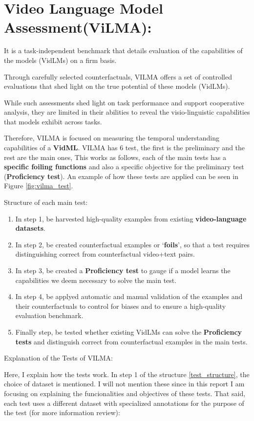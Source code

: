 \section{Video Language Model Assessment(ViLMA):}

It is a task-independent benchmark that details evaluation of the capabilities of the models (VidLMs) on a firm basis.

Through carefully selected counterfactuals, VILMA offers a set of controlled evaluations that shed light on the true potential of these models (VidLMs).

While such assessments shed light on task performance and support cooperative analysis, they are limited in their abilities to reveal the visio-linguistic capabilities that models exhibit across tasks.

Therefore, VILMA is focused on measuring the temporal understanding capabilities of a \textbf{VidML}. VILMA has 6 test, the first is the preliminary and the rest are the main ones, This works as follows, each of the main tests has a \textbf{specific foiling functions} and also a specific objective for the preliminary test (\textbf{Proficiency test}). An example of how these tests are applied can be seen in Figure \ref{fig:vilma_test}.

Structure of each main test:

\begin{enumerate} \label{test_structure}
\item In step 1, be harvested high-quality examples from existing \textbf{video-language datasets}.
\item In step 2, be created counterfactual examples or ‘\textbf{foils}’, so that a test requires distinguishing correct from counterfactual video+text pairs.
\item In step 3, be created a \textbf{Proficiency test} to gauge if a model learns the capabilities we deem necessary to solve the main test.
\item In step 4, be applyed automatic and manual validation of the examples and their counterfactuals to control for biases and to ensure a high-quality evaluation benchmark.
\item Finally step, be tested whether existing VidLMs can solve the \textbf{Proficiency tests} and distinguish correct from counterfactual examples in the main tests.
\end{enumerate}

Explanation of the Tests of VILMA:

Here, I explain how the tests work. In step 1 of the structure \ref{test_structure}, the choice of dataset is mentioned. I will not mention these since in this report I am focusing on explaining the funcionalities and objectives of these tests. That said, each test uses a different dataset with specialized annotations for the purpose of the test (for more information review):

